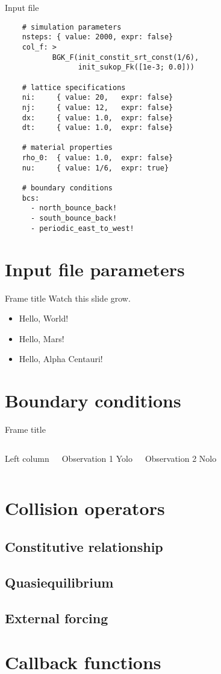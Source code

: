 \documentclass[pdf]{beamer}
\begin{document}
\begin{frame}[fragile]{Input file}
  \tiny
  \begin{verbatim}
    # simulation parameters
    nsteps: { value: 2000, expr: false}
    col_f: >
           BGK_F(init_constit_srt_const(1/6),
                 init_sukop_Fk([1e-3; 0.0]))

    # lattice specifications
    ni:     { value: 20,   expr: false}
    nj:     { value: 12,   expr: false}
    dx:     { value: 1.0,  expr: false}
    dt:     { value: 1.0,  expr: false}

    # material properties
    rho_0:  { value: 1.0,  expr: false}
    nu:     { value: 1/6,  expr: true}

    # boundary conditions
    bcs:
      - north_bounce_back!
      - south_bounce_back!
      - periodic_east_to_west!
  \end{verbatim}
\end{frame}

\section{Input file parameters}

\begin{frame}{Frame title}
  Watch this slide grow.
  \pause
  \begin{itemize}
    \item Hello, World!
      \pause
    \item Hello, Mars!
      \pause
    \item Hello, Alpha Centauri!
  \end{itemize}
\end{frame}

\section{Boundary conditions}

\begin{frame}{Frame title}
  \begin{columns}
    Left column
    \begin{block}{Observation 1}
      Yolo
    \end{block}
    \begin{block}{Observation 2}
      Nolo
    \end{block}
  \end{columns}
\end{frame}

\section{Collision operators}

\subsection{Constitutive relationship}
\subsection{Quasiequilibrium}
\subsection{External forcing}
\section{Callback functions}
\end{document}
